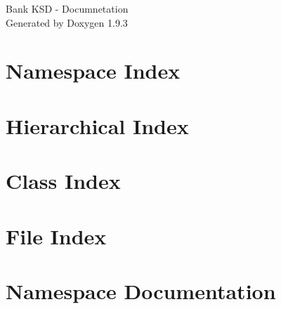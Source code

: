 \documentclass[twoside]{book}
\newcommand{\+}{\discretionary{\mbox{\scriptsize$\hookleftarrow$}}{}{}}
\newcommand{\clearemptydoublepage}{%
    \newpage{\pagestyle{empty}\cleardoublepage}%
  }
\begin{document}
  \raggedbottom
    \hypersetup{pageanchor=false,
                bookmarksnumbered=true,
                pdfencoding=unicode
               }
  \begin{titlepage}
  \vspace*{7cm}
  \begin{center}%
  {\Large Bank KSD -\/ Documnetation}\\
  \vspace*{1cm}
  {\large Generated by Doxygen 1.9.3}\\
  \end{center}
  \end{titlepage}
  \clearemptydoublepage
  \tableofcontents
  \clearemptydoublepage
  \hypersetup{pageanchor=true}
\chapter{Namespace Index}

\chapter{Hierarchical Index}

\chapter{Class Index}

\chapter{File Index}

\chapter{Namespace Documentation}






\end{document}
